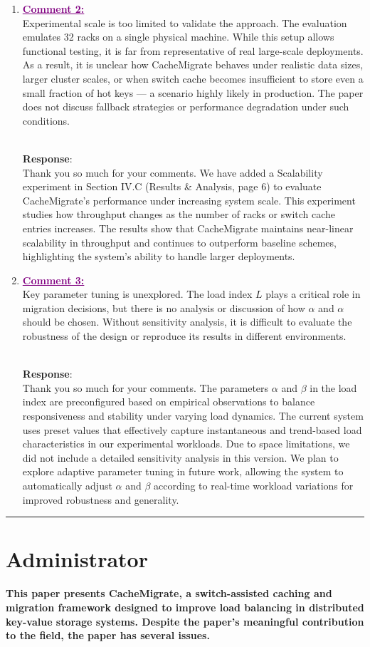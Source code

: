 \documentclass[11pt]{article}
\newcounter{reviewer}
\newcommand{\reviewersection}[1]{
    \bigskip
    \hrule
    \section*{#1}
}
\newenvironment{reply}
   {\medskip \noindent \color{blue} \begin{sf}\\ \textbf{Response}:\\  }
   {\medskip \par \end{sf}}
\newcommand{\comment}[1]{\textcolor{purple}{\textbf{\underline{Comment #1:}}}\\}
\DeclareRobustCommand{\thanksfor}[1]{Thank you so much for #1}
\begin{document}
\begin{enumerate}
    \item \comment{2} Experimental scale is too limited to validate the approach. The evaluation emulates 32 racks on a single physical machine. While this setup allows functional testing, it is far from representative of real large-scale deployments. As a result, it is unclear how CacheMigrate behaves under realistic data sizes, larger cluster scales, or when switch cache becomes insufficient to store even a small fraction of hot keys — a scenario highly likely in production. The paper does not discuss fallback strategies or performance degradation under such conditions.
          \begin{reply}
              \thanksfor{your comments}. We have added a Scalability experiment in Section IV.C (Results \& Analysis, page 6) to evaluate CacheMigrate's performance under increasing system scale. This experiment studies how throughput changes as the number of racks or switch cache entries increases. The results show that CacheMigrate maintains near-linear scalability in throughput and continues to outperform baseline schemes, highlighting the system's ability to handle larger deployments.
          \end{reply}

    \item \comment{3} Key parameter tuning is unexplored.
          The load index \( L \) plays a critical role in migration decisions, but there is no analysis or discussion of how $\alpha$ and $\alpha$ should be chosen. Without sensitivity analysis, it is difficult to evaluate the robustness of the design or reproduce its results in different environments.
          \begin{reply}
              \thanksfor{your comments}. The parameters $\alpha$ and $\beta$ in the load index are preconfigured based on empirical observations to balance responsiveness and stability under varying load dynamics. The current system uses preset values that effectively capture instantaneous and trend-based load characteristics in our experimental workloads. Due to space limitations, we did not include a detailed sensitivity analysis in this version. We plan to explore adaptive parameter tuning in future work, allowing the system to automatically adjust $\alpha$ and $\beta$ according to real-time workload variations for improved robustness and generality.
          \end{reply}
\end{enumerate}

\reviewersection{Administrator}
\textbf{This paper presents CacheMigrate, a switch-assisted caching and migration framework designed to improve load balancing in distributed key-value storage systems. Despite the paper's meaningful contribution to the field, the paper has several issues.}
\end{document}
